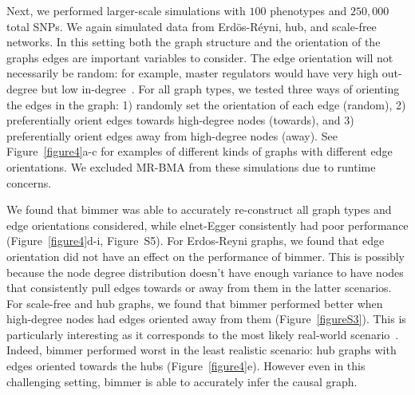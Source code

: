 \documentclass{article}
\begin{document}
Next, we performed larger-scale simulations with $100$ phenotypes and
$250,000$ total SNPs. We again
simulated data from Erd\"os-R\'eyni, hub, and scale-free networks. In this setting
both the graph structure and the orientation of the graphs edges are important
variables to consider. The edge orientation will not necessarily be random:
for example, master regulators would have very high out-degree but low in-degree~\cite{Liu2010}.
For all graph types, we tested three ways of orienting the edges in the graph:
 1) randomly set the orientation
of each edge (random), 2) preferentially orient edges towards high-degree nodes (towards),
 and 3) preferentially orient edges away from high-degree nodes (away). See
 Figure~\ref{figure4}a-c for examples of different kinds of graphs with
 different edge orientations. We excluded
MR-BMA from these simulations due to runtime concerns.

We found that bimmer was able to accurately re-construct all graph types and edge
orientations considered, while
elnet-Egger consistently had poor performance (Figure~\ref{figure4}d-i, Figure~S5).
 For Erdos-Reyni graphs, we found that edge orientation did not have an effect on the
 performance of bimmer. This is possibly because the node degree distribution
 doesn't have enough variance to have nodes that consistently pull edges towards
 or away from them in the latter scenarios. For scale-free and hub graphs, we
 found that bimmer performed better when high-degree nodes had edges oriented
 away from them (Figure~\ref{figureS3}). This is particularly interesting as
 it corresponds to the most likely real-world scenario~\cite{Barabasi1999}. Indeed, bimmer
 performed worst in the least realistic scenario: hub graphs with edges oriented
 towards the hubs (Figure~\ref{figure4}e). However even in this challenging setting, bimmer
 is able to accurately infer the causal graph.
\end{document}
